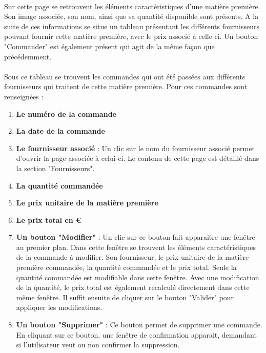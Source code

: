 \paragraph{}
Sur cette page se retrouvent les éléments caractéristiques d'une matière 
première. Son image associée, son nom, ainsi que sa quantité disponible sont 
présents. A la suite de ces informations se situe un tableau présentant les 
différents fournisseurs pouvant fournir cette matière première, avec le prix 
associé à celle ci. Un bouton "Commander" est également présent qui agit de la 
même façon que précédemment.

\paragraph{}
Sous ce tableau se trouvent les commandes qui ont été passées aux différents 
fournisseurs qui traitent de cette matière première. Pour ces commandes sont 
renseignées :
\begin{enumerate}
  \item \textbf{Le numéro de la commande}
  \item \textbf{La date de la commande}
  \item \textbf{Le fournisseur associé} : Un clic sur le nom du fournisseur 
  associé permet d'ouvrir la page associée à celui-ci. Le contenu de cette page 
  est détaillé dans la section "Fournisseurs".
  \item \textbf{La quantité commandée}
  \item \textbf{Le prix unitaire de la matière première}
  \item \textbf{Le prix total en €}
  \item \textbf{Un bouton "Modifier"} : Un clic sur ce bouton fait apparaitre 
  une fenêtre au premier plan. Dans cette fenêtre se trouvent les éléments 
  caractéristiques de la commande à modifier. Son fournisseur, le prix unitaire 
  de la matière première commandée, la quantité commandée et le prix total.
  Seule la quantité commandée est modifiable dans cette fenêtre. Avec une 
  modification de la quantité, le prix total est également recalculé 
  directement dans cette même fenêtre. Il suffit ensuite de cliquer sur le 
  bouton "Valider" pour appliquer les modifications.

  \item \textbf{Un bouton "Supprimer"} : Ce bouton permet de supprimer une 
  commande. En cliquant sur ce bouton, une fenêtre de confirmation apparait, 
  demandant si l'utilisateur veut ou non confirmer la suppression.
\end{enumerate}

